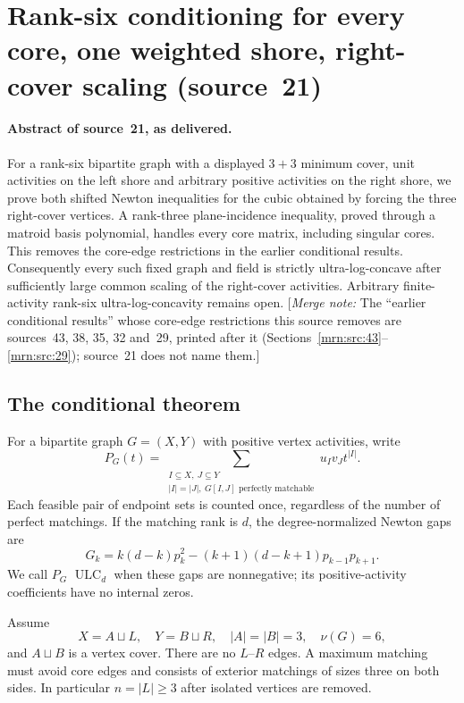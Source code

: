 \documentclass[11pt,a4paper]{article}
\theoremstyle{remark}\newtheorem{remark}[theorem]{Remark}
\newcommand{\ULC}{\operatorname{ULC}}      %
\newcommand{\mnote}[1]{[\textit{Merge note:} #1]}
\begin{document}
\section{Rank-six conditioning for every core, one weighted shore, right-cover scaling (source~21)}\label{mrn:src:21}
\paragraph{Abstract of source~21, as delivered.} For a rank-six bipartite graph with a displayed $3+3$ minimum cover, unit activities on the left shore and arbitrary positive activities on the right shore, we prove both shifted Newton inequalities for the cubic obtained by forcing the three right-cover vertices. A rank-three plane-incidence inequality, proved through a matroid basis polynomial, handles every core matrix, including singular cores. This removes the core-edge restrictions in the earlier conditional results. Consequently every such fixed graph and field is strictly ultra-log-concave after sufficiently large common scaling of the right-cover activities. Arbitrary finite-activity rank-six ultra-log-concavity remains open.
\mnote{The ``earlier conditional results'' whose core-edge restrictions this source removes are sources~43, 38, 35, 32 and~29, printed after it (Sections~\ref{mrn:src:43}--\ref{mrn:src:29}); source~21 does not name them.}

\subsection{The conditional theorem}
For a bipartite graph $G=(X,Y)$ with positive vertex activities, write
\[
 P_G(t)=\sum_{\substack{I\subseteq X,\ J\subseteq Y\\
 |I|=|J|,\ G[I,J]\text{ perfectly matchable}}}u_Iv_Jt^{|I|}.
\]
Each feasible pair of endpoint sets is counted once, regardless of the number of perfect matchings. If the matching rank is $d$, the degree-normalized Newton gaps are
\begin{equation}\label{mrn:e:ec:eq:gap}
 G_k=k(d-k)p_k^2-(k+1)(d-k+1)p_{k-1}p_{k+1}.
\end{equation}
We call $P_G$ $\ULC_d$ when these gaps are nonnegative; its positive-activity coefficients have no internal zeros.

Assume
\[
 X=A\sqcup L,\quad Y=B\sqcup R,\quad
 |A|=|B|=3,\quad \nu(G)=6,
\]
and $A\sqcup B$ is a vertex cover. There are no $L$--$R$ edges. A maximum matching must avoid core edges and consists of exterior matchings of sizes three on both sides. In particular $n=|L|\ge3$ after isolated vertices are removed.
\end{document}
